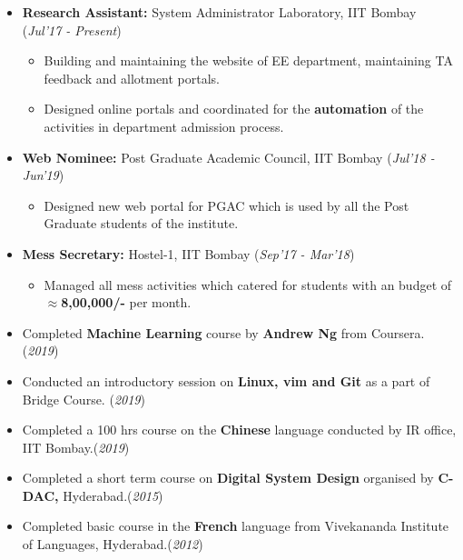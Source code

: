 \documentclass[10pt]{article}
\begin{document}
\begin{itemize}[leftmargin=0.4cm]


\item \textbf {Research Assistant:} System Administrator Laboratory, IIT Bombay \hfill{(\textit{Jul'17 - Present})}
\begin{itemize}
    \item Building and maintaining the website of EE department, maintaining TA feedback and allotment portals.
    \item Designed online portals and coordinated for the \textbf{automation} of the activities in department admission process.
\end{itemize}
    


\item \textbf{Web Nominee:} Post Graduate Academic Council, IIT Bombay \hfill{(\textit{Jul'18 - Jun'19})}
\begin{itemize}
	\item Designed new web portal for PGAC which is used by all the Post Graduate students of the institute. 
\end{itemize}

\item \textbf{Mess Secretary:}  Hostel-1, IIT Bombay   \hfill{(\textit{Sep'17 - Mar'18})}
\begin{itemize}
	\item Managed all mess activities which catered for  students with an budget of \textbf{$\approx$8,00,000/-} per month.
\end{itemize}


\end{itemize}
%

\colorbox{bl}{} 

\begin{itemize}[leftmargin=0.4cm]
    \item {Completed \textbf{Machine Learning} course by \textbf{Andrew Ng} from Coursera. }\hfill{(\textit{2019})}
    \item {Conducted an introductory session on \textbf{Linux, vim and Git} as a part of Bridge Course. }\hfill{(\textit{2019})}
    \item {Completed a 100 hrs course on the \textbf{Chinese} language conducted by IR office, IIT Bombay.}\hfill{(\textit{2019})}
    \item {Completed a short term course on \textbf{Digital System Design} organised by \textbf{C-DAC,} Hyderabad.}\hfill{(\textit{2015})}
    \item {Completed basic course in the \textbf{French} language from Vivekananda Institute of Languages, Hyderabad.}\hfill{(\textit{2012})}
\end{itemize}

\end{document}
